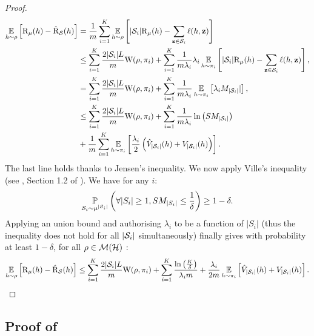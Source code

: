 \documentclass{article}
\begin{document}
\begin{proof}
    \begin{align*}
        \EE_{h\sim\Q}\Big[ \Risk_{\D}(h) - \Riskhat_{\S}(h) \Big] &=  \frac{1}{m}\sum_{i=1}^{K} \EE_{h\sim\Q}\LB |\S_i|\Risk_{\D}(h) - \sum_{\z\in\S_i}\loss(h, \z) \RB\nonumber\\
        &\le \sum_{i=1}^{K} \frac{2|\S_i|L}{m}\W(\Q, \P_i) + \sum_{i=1}^{K} \frac{1}{m\lambda_i}\lambda_i\EE_{h\sim\P_i} \LB |\S_i|\Risk_{\D}(h) - \sum_{\z\in\S_i} \loss(h, \z) \RB, \\
        & = \sum_{i=1}^{K} \frac{2|\S_i|L}{m}\W(\Q, \P_i) + \sum_{i=1}^{K} \frac{1}{m\lambda_i}\EE_{h\sim\P_i} \LB \lambda_i M_{|\S_i|}| \RB, \\
        &\le   \sum_{i=1}^{K} \frac{2|\S_i|L}{m}\W(\Q, \P_i) + \sum_{i=1}^{K} \frac{1}{m\lambda_i} \ln\left( SM_{|\S_i|}  \right) \\
        & + \frac{1}{m}\sum_{i=1}^K \EE_{h\sim\P_i}\LB\frac{\lambda_i}{2}\left( \Vhat_{|\S_i|}(h) + V_{|\S_i|}(h) \right) \RB.
    \end{align*}
    The last line holds thanks to Jensen's inequality.
    We now apply Ville's inequality (see \eg, Section 1.2 of \cite{haddouche2023pac}).
    We have for any $i$: 
    \begin{align*}
    \PP_{\S_i \sim \D^{|\S_i|}}\left( \forall |S_i|\geq 1, SM_{|S_i|} \leq \frac{1}{\delta}  \right) \geq 1-\delta.
    \end{align*}
    Applying an union bound and authorising $\lambda_i$ to be a function of $|S_i|$ (thus the inequality does not hold for all $|\S_i|$ simultaneously) finally gives with probability at least $1-\delta$, for all $\Q\in \Mcal(\H)$ :
    \begin{multline*}
         \EE_{h\sim\Q}\Big[ \Risk_{\D}(h) - \Riskhat_{\S}(h) \Big] \leq    \sum_{i=1}^{K} \frac{2|\S_i|L}{m}\W(\Q, \P_i) + \sum_{i=1}^{K}   \frac{\ln\left( \frac{K}{\delta}  \right)}{\lambda_i m} + \frac{\lambda_i}{2m}\EE_{h\sim\P_i}\LB \Vhat_{|\S_i|}(h) + V_{|\S_i|}(h) \RB.
    \end{multline*}    
\end{proof}

\subsection{Proof of }
\label{sec:proof-supervised}
\end{document}
